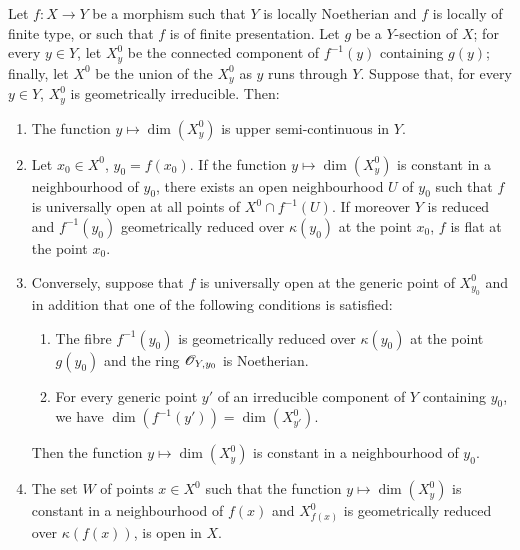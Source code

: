\begin{proposition}[15.6.6]
\label{IV.15.6.6}
Let $f:X\to Y$ be a morphism such that $Y$ is locally Noetherian and $f$ is locally of finite type, or such that $f$ is of finite presentation.
Let $g$ be a $Y$-section of $X$; for every $y\in Y$, let $X_y^0$ be the connected component of $f^{-1}(y)$ containing $g(y)$; finally, let $X^0$ be the union of the $X_y^0$ as $y$ runs through $Y$.
Suppose that, for every $y\in Y$, $X_y^0$ is geometrically irreducible.
Then:
\begin{enumerate}[label=(\roman*)]
  \item The function $y\mapsto\dim(X_y^0)$ is upper semi-continuous in $Y$.
  \item Let $x_0\in X^0$, $y_0=f(x_0)$.
If the function $y\mapsto\dim(X_y^0)$ is constant in a neighbourhood of $y_0$, there exists an open neighbourhood $U$ of $y_0$ such that $f$ is universally open at all points of $X^0\cap f^{-1}(U)$.
If moreover $Y$ is reduced and $f^{-1}(y_0)$ geometrically reduced over $\kappa(y_0)$ at the point $x_0$, $f$ is flat at the point $x_0$.
  \item Conversely, suppose that $f$ is universally open at the generic point of $X_{y_0}^0$ and in addition that one of the following conditions is satisfied:
  \begin{enumerate}
    \item[$\alpha$)] The fibre $f^{-1}(y_0)$ is geometrically reduced over $\kappa(y_0)$ at the point $g(y_0)$ and the ring $\mathscr{O}_{Y,y_0}$ is Noetherian.
    \item[$\beta$)] For every generic point $y'$ of an irreducible component of $Y$ containing $y_0$, we have $\dim(f^{-1}(y'))=\dim(X_{y'}^0)$.
  \end{enumerate}
Then the function $y\mapsto\dim(X_y^0)$ is constant in a neighbourhood of $y_0$.
  \item The set $W$ of points $x\in X^0$ such that the function $y\mapsto\dim(X_y^0)$ is constant in a neighbourhood of $f(x)$ and $X_{f(x)}^0$ is geometrically reduced over $\kappa(f(x))$, is open in $X$.
\end{enumerate}
\end{proposition}

